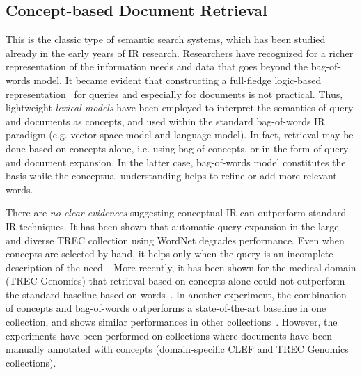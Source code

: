 \subsection{Concept-based Document Retrieval} This is the classic type of semantic search systems, which has been studied already in the early years of IR research. Researchers have recognized for a richer representation of the information needs and data that goes beyond the bag-of-words model. It became evident that constructing a full-fledge logic-based representation~\cite{DBLP:conf/sigir/Rijsbergen89} for queries and especially for documents is not practical. Thus, lightweight \emph{lexical models} have been employed to interpret the semantics of query and documents as concepts, and used within the standard bag-of-words IR paradigm (e.g. vector space model and language model). In fact, retrieval may be done based on concepts alone, i.e. using bag-of-concepts, or in the form of query and document expansion. In the latter case, bag-of-words model constitutes the basis while the conceptual understanding helps to refine or add more relevant words. 

There are \emph{no clear evidences} suggesting conceptual IR can outperform standard IR techniques. It has been shown that automatic query expansion in the large and diverse TREC collection using WordNet degrades performance. Even when concepts are selected by hand, it helps only when the query is an incomplete description of the need~\cite{DBLP:conf/sigir/Voorhees94}. More recently, it has been shown for the medical domain (TREC Genomics) that retrieval based on concepts alone could not outperform the standard baseline based on words~\cite{DBLP:conf/trec/TrieschniggKS06,DBLP:conf/trec/ZhouYTS06}. In another experiment, the combination of concepts and bag-of-words 
outperforms a state-of-the-art baseline in one collection, and shows similar performances in other collections~\cite{DBLP:journals/ipm/MeijTRK10}. However, the experiments have been performed on 
collections where documents have been manually annotated with concepts (domain-specific CLEF and TREC Genomics collections). 

